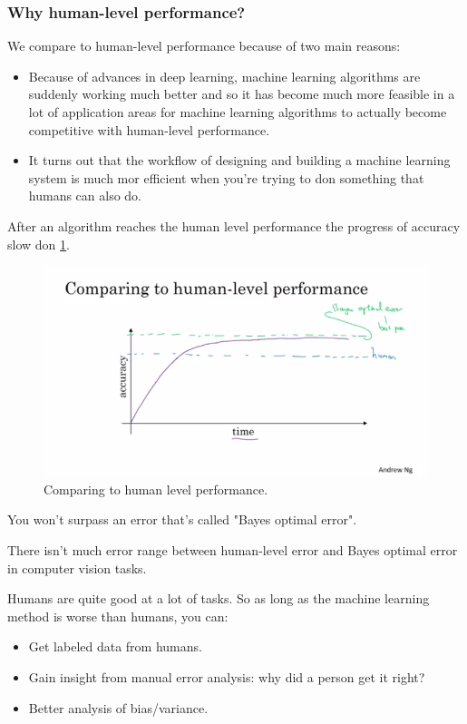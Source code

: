 \subsubsection{Why human-level performance?}
We compare to human-level performance because of two main reasons:
\begin{itemize}
    \item Because of advances in deep learning, machine learning algorithms are suddenly working much better and so it has become much more feasible in a lot of application areas for machine learning algorithms to actually become competitive with human-level performance.
    \item It turns out that the workflow of designing and building a machine learning system is much mor efficient when you're trying to don something that humans can also do.
\end{itemize}

After an algorithm reaches the human level performance the progress of accuracy slow don \ref{humanlevelperformance}.

\begin{figure}
    \centering
    \includegraphics[width=1.0\textwidth, trim={20 50 0 50}, clip]{img/c2/human-level_performance.png}
    \caption{Comparing to human level performance.}
    \label{humanlevelperformance}
\end{figure}

You won't surpass an error that's called "Bayes optimal error".

There isn't much error range between human-level error and Bayes optimal error in computer vision tasks.

Humans are quite good at a lot of tasks. So as long as the machine learning method is worse than humans, you can:

\begin{itemize}
    \item Get labeled data from humans.
    \item Gain insight from manual error analysis: why did a person get it right?
    \item Better analysis of bias/variance.
\end{itemize}

